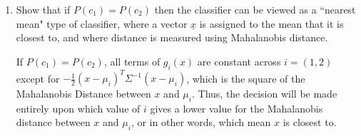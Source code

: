 \documentclass[11pt]{article}
\def\ux{\underline{x}}
\begin{document}
\begin{enumerate}
\item Show that if $P(c_1) = P(c_2)$ then the classifier can be viewed as a ``nearest mean" type of classifier, where a vector $\ux$ is assigned to the mean that it is closest to, and where distance is measured using Mahalanobis distance.

If $P(c_1) = P(c_2)$, all terms of $g_i(x)$ are constant across $i=(1,2)$ except for $-\frac{1}{2}(x - \mu_i)^T\Sigma^{-1}(x-\mu_i)$, which is the square of the Mahalanobis Distance between $x$ and $\mu_i$. 
Thus, the decision will be made entirely upon which value of $i$ gives a lower value for the Mahalanobis distance between $x$ and $\mu_i$, or in other words, which mean $x$ is closest to.

\end{enumerate}
 
\end{document}
